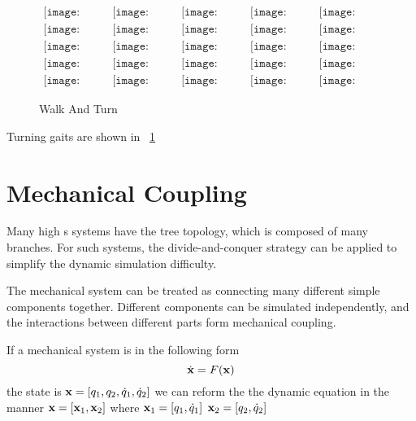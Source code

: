 {\begin{figure}[!htbp]
  \begin{center}
  $
     \begin{array}{ccccc}
\texttt{[image: turn/0001.eps]}&
\texttt{[image: turn/0201.eps]}&
\texttt{[image: turn/0301.eps]}&
\texttt{[image: turn/0401.eps]}&
\texttt{[image: turn/0501.eps]}
\\
\texttt{[image: turn/0601.eps]}&
\texttt{[image: turn/0701.eps]}&
\texttt{[image: turn/0801.eps]}&
\texttt{[image: turn/0901.eps]}&
\texttt{[image: turn/1001.eps]}
\\
\texttt{[image: turn/1101.eps]}&
\texttt{[image: turn/1201.eps]}&
\texttt{[image: turn/1301.eps]}&
\texttt{[image: turn/1401.eps]}&
\texttt{[image: turn/1501.eps]}
\\
\texttt{[image: turn/1601.eps]}&
\texttt{[image: turn/1701.eps]}&
\texttt{[image: turn/1801.eps]}&
\texttt{[image: turn/1901.eps]}&
\texttt{[image: turn/2001.eps]}
\\
\texttt{[image: turn/2101.eps]}&
\texttt{[image: turn/2201.eps]}&
\texttt{[image: turn/2301.eps]}&
\texttt{[image: turn/2401.eps]}&
\texttt{[image: turn/2501.eps]}

\end{array}$
    \caption{Walk And Turn}
    \label{fig:walkturn}
\end{center}
\end{figure}
Turning gaits are shown in ~\ref{fig:walkturn}




\section{Mechanical Coupling}
Many high {\dof}s systems have the tree topology, which is composed of many branches.
For such systems, the divide-and-conquer strategy can be applied to simplify the dynamic simulation difficulty.

The mechanical system can be treated as connecting many different simple components together.
Different components can be simulated independently, and the interactions between different parts form mechanical coupling.

If a mechanical system is in the following form
\[
\dot{\mathbf{x}}=F(\mathbf{x})
\]
the state is $\mathbf{x}=[q_1,q_2,\dot{q}_1,\dot{q}_2]$
we can reform the the dynamic equation in the manner
$\mathbf{x}=[\mathbf{x}_1,\mathbf{x}_2]$
where
$\mathbf{x}_1=[q_1,\dot{q}_1]$
$\mathbf{x}_2=[q_2,\dot{q}_2]$

}
